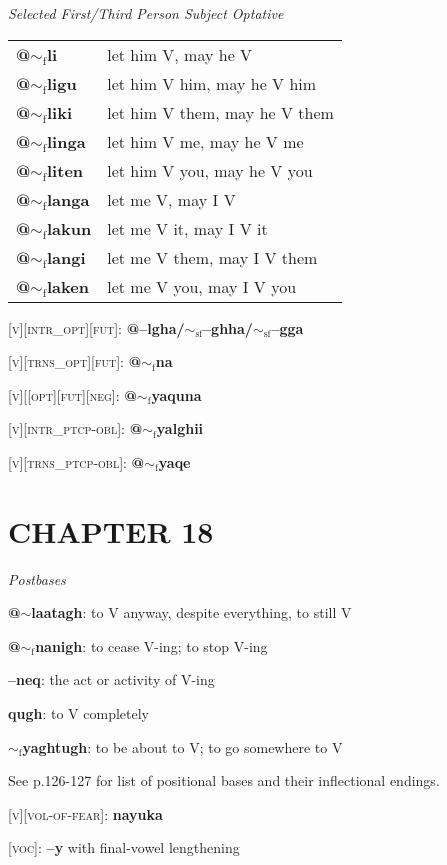 \documentclass{article}
\begin{document}
\bigskip

\textit{Selected First/Third Person Subject Optative}

\begin{tabular}{ l l }
\textbf{@$\sim_\text{f}$li} & let him V, may he V \\
\textbf{@$\sim_\text{f}$ligu} & let him V him, may he V him \\
\textbf{@$\sim_\text{f}$liki} & let him V them, may he V them \\
\textbf{@$\sim_\text{f}$linga} & let him V me, may he V me \\
\textbf{@$\sim_\text{f}$liten} & let him V you, may he V you \\
\textbf{@$\sim_\text{f}$langa} & let me V, may I V \\
\textbf{@$\sim_\text{f}$lakun} & let me V it, may I V it \\
\textbf{@$\sim_\text{f}$langi} & let me V them, may I V them \\
\textbf{@$\sim_\text{f}$laken} & let me V you, may I V you
\end{tabular}

\bigskip

\textsc{[v][intr\_opt][fut]}: \textbf{@--lgha/$\sim_\text{sf}$--ghha/$\sim_\text{sf}$--gga}

\textsc{[v][trns\_opt][fut]}: \textbf{@$\sim_\text{f}$na}

\bigskip

\textsc{[v][[opt][fut][neg]}: \textbf{@$\sim_\text{f}$yaquna}

\bigskip

\textsc{[v][intr\_ptcp-obl]}: \textbf{@$\sim_\text{f}$yalghii}

\textsc{[v][trns\_ptcp-obl]}: \textbf{@$\sim_\text{f}$yaqe}


\section{CHAPTER 18}

\textit{Postbases}
\begin{description}
\item \textbf{@$\sim$laatagh}: to V anyway, despite everything, to still V
\item \textbf{@$\sim_\text{f}$nanigh}: to cease V-ing; to stop V-ing
\item \textbf{--neq}: the act or activity of V-ing
\item \textbf{qugh}: to V completely
\item \textbf{$\sim_\text{f}$yaghtugh}: to be about to V; to go somewhere to V
\end{description}

\bigskip

See p.126-127 for list of positional bases and their inflectional endings.

\bigskip

\textsc{[v][vol-of-fear]}: \textbf{nayuka}

\bigskip

\textsc{[voc]}: \textbf{--y} with final-vowel lengthening
\end{document}

